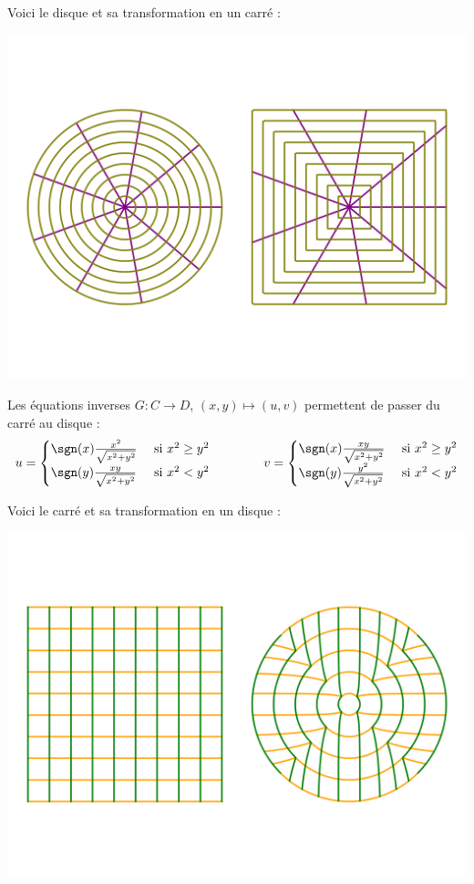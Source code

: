 \documentclass[11pt,class=report,crop=false]{standalone}
\begin{document}
Voici le disque et sa transformation en un carré :
\begin{center}
	\includegraphics[scale=\myscale,scale=0.5,trim={0 2cm 0 2cm},clip]{figures/carre-cercle-02}
\end{center}


Les équations inverses $G : C \to D$, $(x,y) \mapsto (u,v)$ permettent de passer du carré au disque :
$$u = \begin{cases}
	\sgn(x) \frac{x^2}{\sqrt{x^2+y^2}} & \text{ si } x^2 \ge y^2 \\
	\sgn(y) \frac{xy}{\sqrt{x^2+y^2}} & \text{ si } x^2 < y^2 \\
\end{cases}
\qquad\qquad
v = \begin{cases}
	\sgn(x) \frac{xy}{\sqrt{x^2+y^2}} & \text{ si } x^2 \ge y^2 \\
	\sgn(y) \frac{y^2}{\sqrt{x^2+y^2}} & \text{ si } x^2 < y^2 \\
\end{cases}
$$

Voici le carré et sa transformation en un disque :
\begin{center}
	\includegraphics[scale=\myscale,scale=0.5,trim={0 2cm 0 2cm},clip]{figures/carre-cercle-01}
\end{center}
\end{document}
